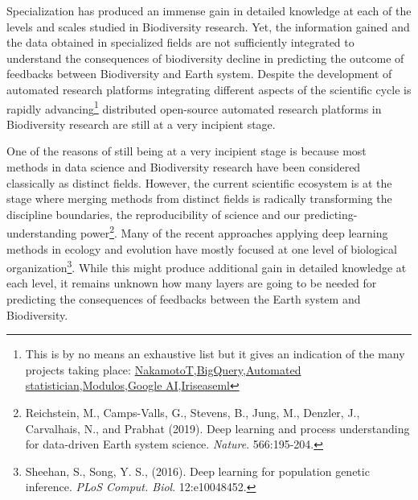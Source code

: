 \documentclass[authoryear,1p,12pt]{elsarticle}
\begin{document}
\noindent Specialization has produced an immense gain in detailed
knowledge at each of the levels and scales studied in Biodiversity
research. Yet, the information gained and the data obtained in
specialized fields are not sufficiently integrated to understand the
consequences of biodiversity decline in predicting the outcome of
feedbacks between Biodiversity and Earth system. Despite the
development of automated research platforms integrating different
aspects of the scientific cycle is rapidly advancing\footnote{This is
  by no means an exhaustive list but it gives an indication of the
  many projects taking place:
  \href{https://www.nterminal.com}{NakamotoT},\href{https://cloud.google.com/bigquery/}{BigQuery},\href{https://www.automaticstatistician.com/index/}{Automated
    statistician},\href{http://www.modulos.ai/}{Modulos},\href{https://ai.google/}{Google
    AI},\href{https://iris.ai}{Iris}\href{https://github.com/DS3Lab/easeml}{easeml}}
distributed open-source automated research platforms in Biodiversity
research are still at a very incipient stage.

One of the reasons of still being at a very incipient stage is because
most methods in data science and Biodiversity research have been
considered classically as distinct fields. However, the current
scientific ecosystem is at the stage where merging methods from
distinct fields is radically transforming the discipline boundaries,
the reproducibility of science and our predicting-understanding
power\footnote{Reichstein, M., Camps-Valls, G., Stevens, B., Jung, M.,
  Denzler, J., Carvalhais, N., and Prabhat (2019). Deep learning and
  process understanding for data-driven Earth system science. {\em
    Nature}. 566:195-204.}. Many of the recent approaches applying
deep learning methods in ecology and evolution have mostly focused at
one level of biological organization\footnote{Sheehan, S., Song,
  Y. S., (2016). Deep learning for population genetic inference.  {\em
    PLoS Comput. Biol}. 12:e10048452.}. While this might produce
additional gain in detailed knowledge at each level, it remains
unknown how many layers are going to be needed for predicting the
consequences of feedbacks between the Earth system and Biodiversity.
\end{document}
